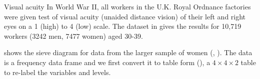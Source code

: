 \documentclass[11pt]{book}
\renewenvironment{knitrout}{\small\renewcommand{\baselinestretch}{.85}}{} %
\begin{document}
\begin{Example}[vision1]{Visual acuity}
In World War II, all workers in the U.K. Royal Ordnance factories
were given test of visual acuity (unaided distance vision)
of their left and right eyes
on a 1 (high) to 4 (low) scale.  The dataset 
in  gives the results for 10,719 workers
(3242 men, 7477 women) aged 30-39.

 shows the sieve diagram for data 
from the larger sample of women
(\citet[Table 33.5]{KendallStuart:61},
\citet[p. 284]{Bishop-etal:75}).
The  data is a frequency data frame
and we first convert it to table form (), 
a $4 \times 4 \times 2$
table to re-label the variables and levels.
\begin{knitrout}
\color{fgcolor}\begin{kframe}
\begin{alltt}
\hlstd{(}\hlstd{,} \hlstd{=}\hlstd{)}
 \hlkwb{<-}  \hlopt{~}  \hlopt{+}  \hlopt{+}  
\hlstd{(VA.tab)[}\hlopt{:}\hlstd{]} \hlkwb{<-} \hlstd{(}\hlstd{(}\hlstd{,} \hlstd{,} \hlstd{,} \hlstd{))}
\hlstd{(}\hlstd{(VA.tab))[}\hlopt{:}\hlstd{]} \hlkwb{<-} \hlstd{(}\hlstd{(}\hlstd{,} \hlstd{),} \hlstd{)}
\end{alltt}
\end{kframe}
\end{knitrout}

\begin{knitrout}
\color{fgcolor}\begin{kframe}
\begin{alltt}
\hlstd{(VA.tab[,,}\hlstd{],} \hlstd{=}\hlstd{)}
\end{alltt}
\end{kframe}\begin{figure}[!htbp]



\end{figure}
\end{knitrout}
\end{Example}
\end{document}
